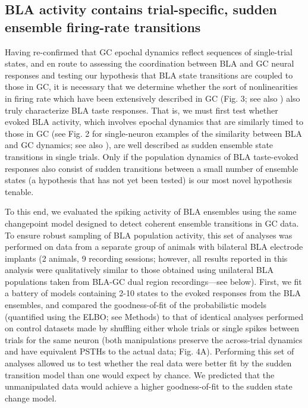 \begin{refsection}
\subsection{BLA activity contains trial-specific, sudden ensemble firing-rate transitions}
Having re-confirmed that GC epochal dynamics reflect sequences of single-trial states, and en route to assessing the coordination between BLA and GC neural responses and testing our hypothesis that BLA state transitions are coupled to those in GC, it is necessary that we determine whether the sort of nonlinearities in firing rate which have been extensively described in GC (Fig. 3; see also \cite{jones2007a,sadacca2016a}) also truly characterize BLA taste responses. That is, we must first test whether evoked BLA activity, which involves epochal dynamics that are similarly timed to those in GC (see Fig. 2 for single-neuron examples of the similarity between BLA and GC dynamics; see also \cite{fontanini2009a}), are well described as sudden ensemble state transitions in single trials. Only if the population dynamics of BLA taste-evoked responses also consist of sudden transitions between a small number of ensemble states (a hypothesis that has not yet been tested) is our most novel hypothesis tenable.

To this end, we evaluated the spiking activity of BLA ensembles using the same changepoint model designed to detect coherent ensemble transitions in GC data. To ensure robust sampling of BLA population activity, this set of analyses was performed on data from a separate group of animals with bilateral BLA electrode implants (2 animals, 9 recording sessions; however, all results reported in this analysis were qualitatively similar to those obtained using unilateral BLA populations taken from BLA-GC dual region recordings—see below). First, we fit a battery of models containing 2-10 states to the evoked responses from the BLA ensembles, and compared the goodness-of-fit of the probabilistic models (quantified using the ELBO; see Methods) to that of identical analyses performed on control datasets made by shuffling either whole trials or single spikes between trials for the same neuron (both manipulations preserve the across-trial dynamics and have equivalent PSTHs to the actual data; Fig. 4A). Performing this set of analyses allowed us to test whether the real data were better fit by the sudden transition model than one would expect by chance. We predicted that the unmanipulated data would achieve a higher goodness-of-fit to the sudden state change model.


\end{refsection}
